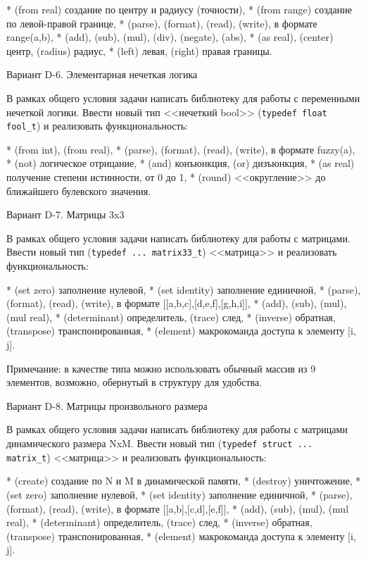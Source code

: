 * (from real) создание по центру и радиусу (точности),
* (from range) создание по левой-правой границе,
* (parse), (format), (read), (write), в формате range(a,b),
* (add), (sub), (mul), (div), (negate), (abs),
* (as real), (center) центр, (radius) радиус,
* (left) левая, (right) правая границы.


Вариант D-6. Элементарная нечеткая логика

В рамках общего условия задачи написать библиотеку для работы с переменными
нечеткой логики. Ввести новый тип <<нечеткий bool>> (\verb|typedef float fool_t|) и
реализовать функциональность:

* (from int), (from real),
* (parse), (format), (read), (write), в формате fuzzy(a),
* (not) логическое отрицание,
* (and) конъюнкция, (or) дизъюнкция,
* (as real) получение степени истинности, от 0 до 1,
* (round) <<округление>> до ближайшего булевского значения.


Вариант D-7. Матрицы 3x3

В рамках общего условия задачи написать библиотеку для работы с матрицами.
Ввести новый тип (\verb|typedef ... matrix33_t|) <<матрица>> и реализовать
функциональность:

* (set zero) заполнение нулевой,
* (set identity) заполнение единичной,
* (parse), (format), (read), (write), в формате [[a,b,c],[d,e,f],[g,h,i]],
* (add), (sub), (mul), (mul real),
* (determinant) определитель, (trace) след,
* (inverse) обратная, (transpose) транспонированная,
* (element) макрокоманда доступа к элементу [i, j].

Примечание: в качестве типа можно использовать обычный массив из 9 элементов,
возможно, обернутый в структуру для удобства.


Вариант D-8. Матрицы произвольного размера

В рамках общего условия задачи написать библиотеку для работы с матрицами
динамического размера NxM. Ввести новый тип (\verb|typedef struct ... matrix_t|)
<<матрица>> и реализовать функциональность:

* (create) создание по N и M в динамической памяти,
* (destroy) уничтожение,
* (set zero) заполнение нулевой,
* (set identity) заполнение единичной, 
* (parse), (format), (read), (write), в формате [[a,b],[c,d],[e,f]],
* (add), (sub), (mul), (mul real),
* (determinant) определитель, (trace) след,
* (inverse) обратная, (transpose) транспонированная,
* (element) макрокоманда доступа к элементу [i, j].

